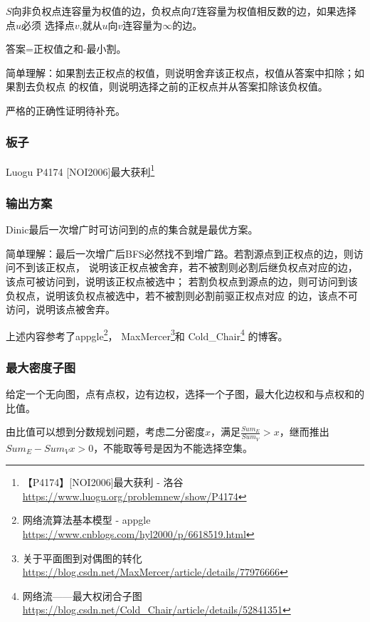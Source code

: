 $S$向非负权点连容量为权值的边，负权点向$T$连容量为权值相反数的边，如果选择点$u$必须
选择点$v$,就从$u$向$v$连容量为$\infty$的边。

答案=正权值之和-最小割。

简单理解：如果割去正权点的权值，则说明舍弃该正权点，权值从答案中扣除；如果割去负权点
的权值，则说明选择之前的正权点并从答案扣除该负权值。

严格的正确性证明待补充。

\subsubsection{板子}

Luogu P4174 [NOI2006]最大获利\footnote{【P4174】[NOI2006]最大获利 - 洛谷
\url{https://www.luogu.org/problemnew/show/P4174}}



\subsubsection{输出方案}

\begin{theorem}
    Dinic最后一次增广时可访问到的点的集合就是最优方案。
\end{theorem}

简单理解：最后一次增广后BFS必然找不到增广路。若割源点到正权点的边，则访问不到该正权点，
说明该正权点被舍弃，若不被割则必割后继负权点对应的边，该点可被访问到，说明该正权点被选中；
若割负权点到源点的边，则可访问到该负权点，说明该负权点被选中，若不被割则必割前驱正权点对应
的边，该点不可访问，说明该点被舍弃。

上述内容参考了appgle\footnote{网络流算法基本模型 - appgle
	\url{https://www.cnblogs.com/hyl2000/p/6618519.html}}，
MaxMercer\footnote{关于平面图到对偶图的转化 \\
	\url{https://blog.csdn.net/MaxMercer/article/details/77976666}}和
Cold\_Chair\footnote{网络流——最大权闭合子图 \\
	\url{https://blog.csdn.net/Cold\_Chair/article/details/52841351}}
的博客。

\subsubsection{最大密度子图}
给定一个无向图，点有点权，边有边权，选择一个子图，最大化边权和与点权和的比值。

由比值可以想到分数规划问题，考虑二分密度$x$，满足$\frac{Sum_E}{Sum_V}>x$，继而推出
$Sum_E-Sum_Vx>0$，不能取等号是因为不能选择空集。

